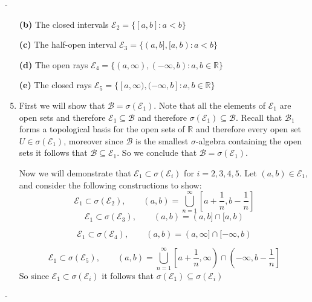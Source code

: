 \documentclass[12pt]{article}
\makeatletter
\theoremstyle{ex215}
\newcounter{probcount}
\newlength\probsep
\newlength\pshrinking
\newenvironment{problems}%
  {\ifhmode\unskip\par\fi\setcounter{probcount}{0}\probsep\parskip
  \sbox\@tempboxa{\textbf{9.}}\pshrinking\wd\@tempboxa\advance\pshrinking\labelsep
  \advance\linewidth -\pshrinking
  \advance\@totalleftmargin\pshrinking
  \advance\leftskip\pshrinking}%
  {\ifhmode\unskip \par\fi\advance\leftskip-\pshrinking}%
\renewenvironment{proof}[1][\proofname]{\par
  \pushQED{\qed}%
  \normalfont \topsep6\p@\@plus6\p@\relax
  \trivlist
  \@topsep \topsep
  \item[\hskip\labelsep
        \itshape
    #1\@addpunct{.}]\ignorespaces
}{%
  \popQED\endtrivlist\@endpefalse
}
\newcommand{\Reals}{\ensuremath{\mathbb R}}
\let\RR\Reals
\makeatother
\begin{document}
\begin{problems}
\begin{enumerate}
    \item[\textbf{(b)}] The closed intervals $\mathcal{E}_2 = \{[a, b]: a < b\}$
    \item[\textbf{(c)}] The half-open interval $\mathcal{E}_3 = \{(a, b], [a, b) : a < b\}$  
    \item[\textbf{(d)}] The open rays $\mathcal{E}_4 = \{(a, \infty), (-\infty, b): a, b \in \RR\}$
    \item[\textbf{(e)}] The closed rays $\mathcal{E}_5 = \{[a, \infty), (-\infty, b]: a, b \in \RR\}$    
    \begin{proof} First we will show that $\mathcal{B} = \sigma(\mathcal{E }_1)$. Note that all the elements of $\mathcal{E }_1$ are open sets and therefore $\mathcal{E}_1 \subseteq \mathcal{B }$ and therefore $\sigma(\mathcal{E }_1) \subseteq \mathcal{B}$. Recall that $\mathcal{B_1}$ forms a topological basis for the open sets of $\RR$ and therefore every open set $U \in \sigma(\mathcal{E}_1)$, moreover since $\mathcal{B}$ is the smallest $\sigma$-algebra containing the open sets it follows that $\mathcal{B} \subseteq \mathcal{E}_1$. So we conclude that $\mathcal{B } = \sigma(\mathcal{E }_1)$. 

      Now we will demonstrate that $\mathcal{E}_1 \subset \sigma(\mathcal{E }_i)$ for $i = 2, 3, 4, 5$. Let $(a, b)\in \mathcal{E }_1$, and consider the following constructions to show:
      \begin{equation*}
        \mathcal{E}_1 \subset \sigma(\mathcal{E }_2), \qquad (a, b) = \bigcup_{n = 1}^\infty \left[a + \frac{1}{n}, b - \frac{1}{n}\right]
      \end{equation*}
      \begin{equation*}
        \mathcal{E}_1 \subset \sigma(\mathcal{E }_3), \qquad (a, b) = (a, b] \cap [a, b)
      \end{equation*}
  
      \begin{equation*}
        \mathcal{E}_1 \subset \sigma(\mathcal{E }_4), \qquad (a, b) = (a, \infty] \cap [-\infty, b)
      \end{equation*}
  
      \begin{equation*}
        \mathcal{E}_1 \subset \sigma(\mathcal{E }_5), \qquad (a, b) = \bigcup_{n = 1}^\infty \left[a + \frac{1}{n}, \infty\right) \cap \left(-\infty, b - \frac{1}{n}\right]
      \end{equation*}
      So since $\mathcal{E}_1 \subset \sigma(\mathcal{E }_i)$ it follows that $
      \sigma(\mathcal{E}_1) \subseteq \sigma(\mathcal{E }_i)$


\end{proof}
\end{enumerate}
\end{problems}
\end{document}
